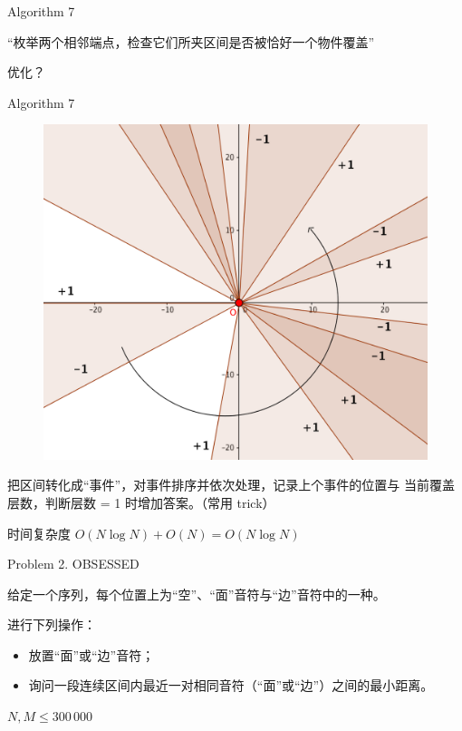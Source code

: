\documentclass[UTF8]{beamer}
\begin{document}
\begin{frame}{Algorithm 7}

“枚举两个相邻端点，检查它们所夹区间是否被恰好一个物件覆盖”\newline\newline

优化？

\end{frame}

\begin{frame}{Algorithm 7}

\begin{figure}[h]\centering
\includegraphics[scale=0.333]{a5.png}
\end{figure}

把区间转化成“事件”，对事件排序并依次处理，记录上个事件的位置与%
当前覆盖层数，判断层数 = 1 时增加答案。（常用 trick）

时间复杂度 $O(N \log N) + O(N) = O(N \log N)$

\end{frame}


\begin{frame}{Problem 2. OBSESSED}

给定一个序列，每个位置上为“空”、“面”音符与“边”音符中的一种。

进行下列操作：
\begin{itemize}
    \item 放置“面”或“边”音符；
    \item 询问一段连续区间内最近一对相同音符（“面”或“边”）之间的最小距离。
\end{itemize}

$N, M \leq 300\,000$

\end{frame}
\end{document}
